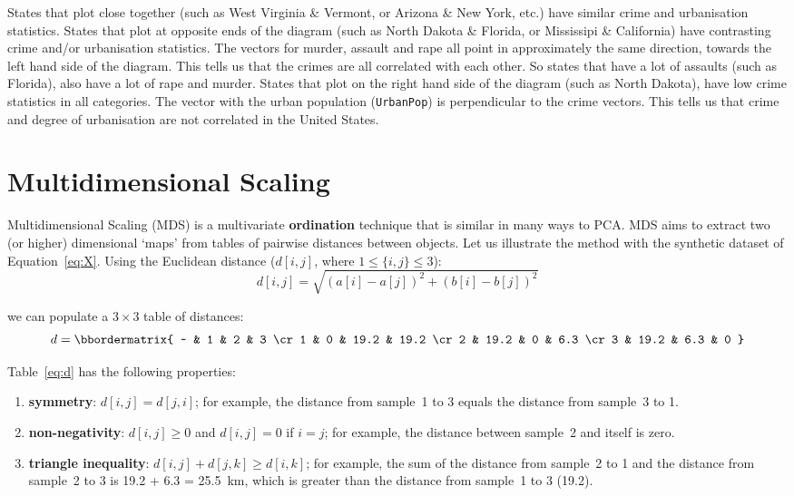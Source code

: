 States that plot close together (such as West Virginia \& Vermont, or
Arizona \& New York, etc.)  have similar crime and urbanisation
statistics.  States that plot at opposite ends of the diagram (such as
North Dakota \& Florida, or Mississipi \& California) have contrasting
crime and/or urbanisation statistics.  The vectors for murder, assault
and rape all point in approximately the same direction, towards the
left hand side of the diagram. This tells us that the crimes are all
correlated with each other. So states that have a lot of assaults
(such as Florida), also have a lot of rape and murder. States that
plot on the right hand side of the diagram (such as North Dakota),
have low crime statistics in all categories.  The vector with the
urban population (\texttt{UrbanPop}) is perpendicular to the crime
vectors. This tells us that crime and degree of urbanisation are not
correlated in the United States.

\section{Multidimensional Scaling}
\label{sec:MDS}

Multidimensional Scaling (MDS) is a multivariate \textbf{ordination}
technique that is similar in many ways to PCA. MDS aims to extract two
(or higher) dimensional `maps' from tables of pairwise distances
between objects. Let us illustrate the method with the synthetic
dataset of Equation~\ref{eq:X}. Using the Euclidean distance
($d[i,j]$, where $1\leq\{i,j\}\leq{3}$):
\begin{equation}
  d[i,j] = \sqrt{(a[i]-a[j])^2 + (b[i]-b[j])^2}
  \label{eq:euclidean}
\end{equation}

\noindent we can populate a ${3}\times{3}$ table of distances:
\begin{equation}
  d = \bbordermatrix{
    ~ & 1    & 2    & 3 \cr
    1 & 0    & 19.2 & 19.2 \cr
    2 & 19.2 & 0    & 6.3 \cr
    3 & 19.2 & 6.3  & 0
  }
  \label{eq:d}
\end{equation}

Table~\ref{eq:d} has the following properties:

\begin{enumerate}
\item{\bf symmetry}: $d[i,j]=d[j,i]$; for example, the distance from
  sample~1 to 3 equals the distance from sample~3 to 1.
\item{\bf non-negativity}: $d[i,j]\geq{0}$ and $d[i,j]=0$ if $i=j$;
  for example, the distance between sample~2 and itself is zero.
\item{\bf triangle inequality}: $d[i,j]+d[j,k]\geq{d[i,k]}$; for
  example, the sum of the distance from sample~2 to 1 and the distance
  from sample~2 to 3 is 19.2 + 6.3 = 25.5~km, which is greater than
  the distance from sample~1 to 3 (19.2).
\end{enumerate}

